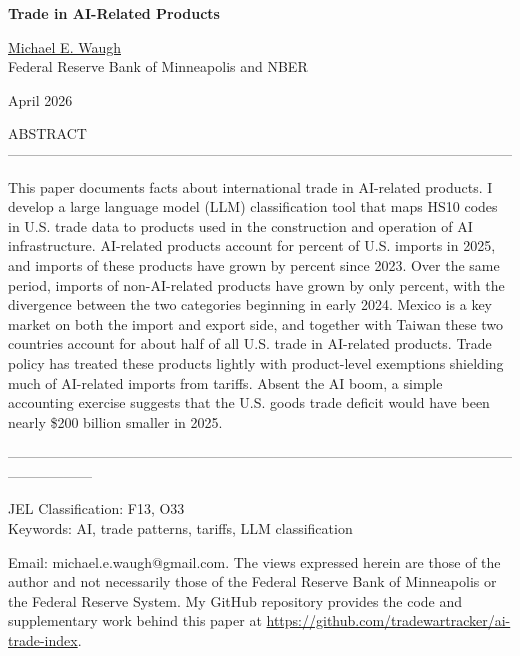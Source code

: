 \documentclass[12pt,pdftex]{article}
\begin{document}
\begin{onehalfspacing}

{\large \textbf{Trade in AI-Related Products}}

\vspace{0.5cm}

\href{http://www.waugheconomics.com/}{Michael E. Waugh} \\ Federal Reserve Bank of Minneapolis and NBER

\vspace{0.5cm}

April 2026

\vspace{2.25cm}


\normalsize

ABSTRACT ------------------------------------------------------------------------------------------------------------

This paper documents facts about international trade in AI-related products. I develop a large language model (LLM) classification tool that maps HS10 codes in U.S. trade data to products used in the construction and operation of AI infrastructure. AI-related products account for \aiShareTwentyFive{} percent of U.S. imports in 2025, and imports of these products have grown by \highAiPctChange{} percent since 2023. Over the same period, imports of non-AI-related products have grown by only \lowAiPctChange{} percent, with the divergence between the two categories beginning in early 2024. Mexico is a key market on both the import and export side, and together with Taiwan these two countries account for about half of all U.S. trade in AI-related products. Trade policy has treated these products lightly with product-level exemptions shielding much of AI-related imports from tariffs. Absent the AI boom, a simple accounting exercise suggests that the U.S. goods trade deficit would have been nearly \$200 billion smaller in 2025.

------------------------------------------------------------------------------------------------------------------------------
\vspace{0.25cm}

JEL Classification: F13, O33\\
Keywords: AI, trade patterns, tariffs, LLM classification



\vspace{2.75cm}

{\footnotesize Email: michael.e.waugh@gmail.com. The views expressed herein are those of the author and not necessarily those of the Federal Reserve Bank of Minneapolis or the Federal Reserve System. My GitHub repository provides the code and supplementary work behind this paper at \url{https://github.com/tradewartracker/ai-trade-index}.}


\end{onehalfspacing}
\end{document}
